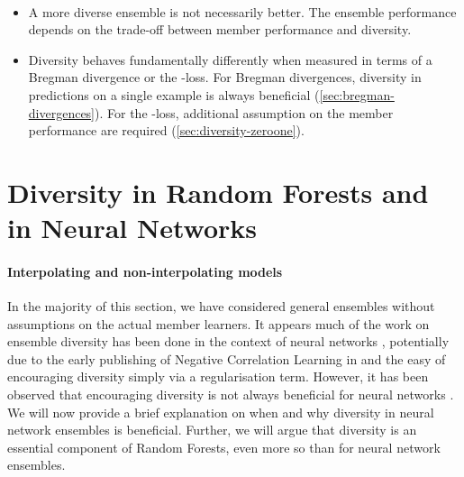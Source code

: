 \documentclass[
	twoside=false, %
]{kaobook}
\begin{document}
\begin{observation} ~~
\begin{itemize}
\item A more diverse ensemble is not necessarily better. The ensemble performance depends on the trade-off between member performance and diversity.
\item Diversity behaves fundamentally differently when measured in terms of a Bregman divergence or the \zeroone-loss. For Bregman divergences, diversity in predictions on a single example is always beneficial (\cf \ref{sec:bregman-divergences}). For the \zeroone-loss, additional assumption on the member performance are required (\cf \ref{sec:diversity-zeroone}). 
\end{itemize}
\end{observation}




\section{Diversity in Random Forests and in Neural Networks}
\label{sec:diversity-rfs-nns}

\paragraph{Interpolating and non-interpolating models} 

In the majority of this section, we have considered general ensembles without assumptions on the actual member learners. It appears much of the work on ensemble diversity has been done in the context of neural networks
\cite{liu_EnsembleLearningNegative_1999,li_NeuralNetworkEnsembles_2021,abe_PathologiesPredictiveDiversity_2023,abe_BestDeepEnsembles_2022}, potentially due to the early publishing of Negative Correlation Learning \cite{liu_EnsembleLearningNegative_1999} in \citeyear{liu_EnsembleLearningNegative_1999} and the easy of encouraging diversity simply via a regularisation term. 
However, it has been observed that encouraging diversity is not always beneficial for neural networks
\cite{adnan_ComplementRandomForest_2015,liu_EnsembleLearningNegative_1999,li_NeuralNetworkEnsembles_2021}. 
We will now provide a brief explanation on when and why diversity in neural network ensembles is beneficial. Further, we will argue that diversity is an essential component of Random Forests, even more so than for neural network ensembles.
\end{document}
